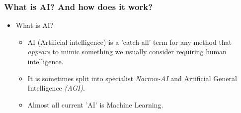 \begin{frame}
\frametitle{What is AI? And how does it work?}

\begin{itemize}
    \item What is AI?
    \begin{itemize}
        \item AI (Artificial intelligence) is a 'catch-all' term for any method that \textit{appears} to mimic something we usually consider requiring human intelligence.
        \item It is sometimes split into specialist \textit{Narrow-AI} and Artificial General Intelligence \textit{(AGI)}.
        \item Almost all current 'AI' is Machine Learning.
    \end{itemize}
\end{itemize}



\end{frame}